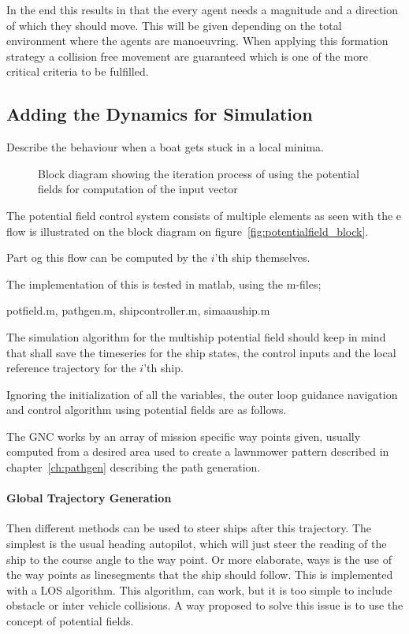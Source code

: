 In the end this results in that the every agent needs a magnitude and a direction of which they should move. This will be given depending on the total environment where the agents are manoeuvring. When applying this formation strategy a collision free movement are guaranteed which is one of the more critical criteria to be fulfilled. 

\subsection{Adding the Dynamics for Simulation}

Describe the behaviour when a boat gets stuck in a local minima.

\begin{figure}[htbp]
\centering

\caption{Block diagram showing the iteration process of using the
potential fields for computation of the input vector}
\label{fig:potentialfield_block}
\end{figure}

The potential field control system consists of multiple elements
as seen with the e flow is illustrated on the block diagram on
figure~\vref{fig:potentialfield_block}.

Part og this flow can be computed by the $i$'th ship themselves.

The implementation of this is tested in matlab, using the m-files;

potfield.m, pathgen.m, shipcontroller.m, simaauship.m

The simulation algorithm for the multiship potential field should keep
in mind that shall save the timeseries for the ship states, the
control inputs and the local reference trajectory for the $i$'th ship.

Ignoring the initialization of all the variables, the outer loop
guidance navigation and control algorithm using potential fields are
as follows.

The \ac{GNC} works by an array of mission specific way points given,
usually computed from a desired area used to create a lawnmower
pattern described in chapter~\vref{ch:pathgen} describing the path
generation.

\paragraph{Global Trajectory Generation}
Then different methods can be used to steer ships after this
trajectory. The simplest is the usual heading autopilot, which will
just steer the reading of the ship to the course angle to the
way point. Or more elaborate, ways is the use of the way points as
linesegments that the ship should follow. This is implemented with a
\ac{LOS} algorithm. This algorithm, can work, but it is too simple to
include obstacle or inter vehicle collisions. A way proposed to solve
this issue is to use the concept of potential fields.

